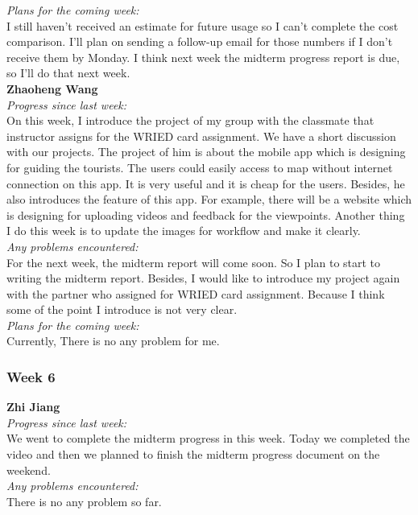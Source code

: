 \noindent\textit{Plans for the coming week:}\\
I still haven't received an estimate for future usage so I can't complete the cost comparison. I'll plan on sending a follow-up email for those numbers if I don't receive them by Monday. I think next week the midterm progress report is due, so I'll do that next week.\\

\noindent\textbf{Zhaoheng Wang}\\
\noindent\textit{Progress since last week:}\\
On this week, I introduce the project of my group with the classmate that instructor assigns for the WRIED card assignment. We have a short discussion with our projects. The project of him is about the mobile app which is designing for guiding the tourists. The users could easily access to map without internet connection on this app. It is very useful and it is cheap for the users. Besides, he also introduces the feature of this app. For example, there will be a website which is designing for uploading videos and feedback for the viewpoints. Another thing I do this week is to update the images for workflow and make it clearly.\\

\noindent\textit{Any problems encountered:}\\
For the next week, the midterm report will come soon. So I plan to start to writing the midterm report. Besides, I would like to introduce my project again with the partner who assigned for WRIED card assignment. Because I think some of the point I introduce is not very clear.\\

\noindent\textit{Plans for the coming week:}\\
Currently, There is no any problem for me.\\

\subsubsection{Week 6}
\textbf{Zhi Jiang}\\
\noindent\textit{Progress since last week:}\\
We went to complete the midterm progress in this week. Today we completed the video and then we planned to finish the midterm progress document on the weekend.\\

\noindent\textit{Any problems encountered:}\\
There is no any problem so far.\\

